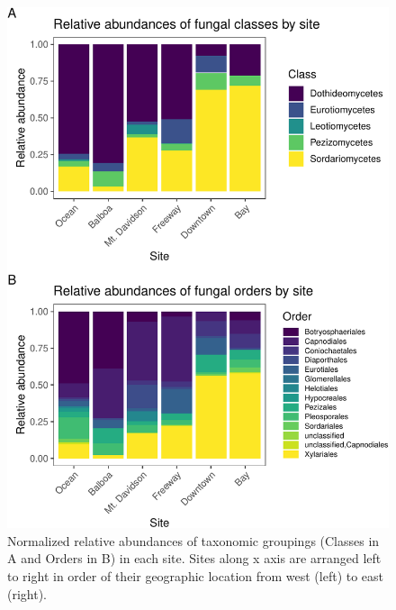 \documentclass[fleqn,10pt,lineno]{wlpeerj} %
\begin{document}
\begin{figure}
\centering
\includegraphics{gibson2021_files/figure-latex/taxonomy-by-site-plot-1.pdf}
\caption{\label{fig:taxonomy-by-site-plot}Normalized relative abundances of taxonomic groupings (Classes in A and Orders in B) in each site. Sites along x axis are arranged left to right in order of their geographic location from west (left) to east (right).}
\end{figure}
\end{document}
